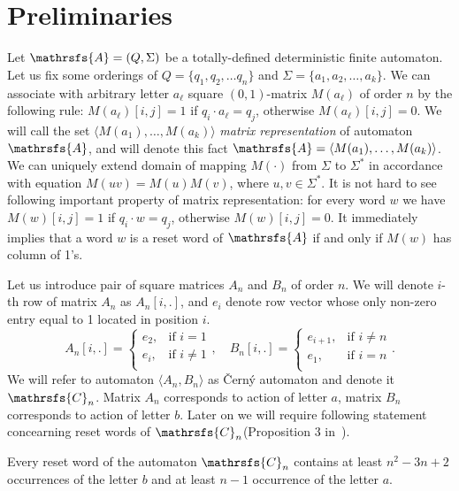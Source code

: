 \documentclass[11pt]{llncs}
\newcommand{\A}{\mathrsfs{A}}
\newcommand{\C}{\mathrsfs{C}}
\begin{document}
\section{Preliminaries}
Let $\A = (Q, \Sigma)$ be a totally-defined deterministic finite automaton. Let us fix some orderings 
of $Q = \{q_1, q_2, \ldots q_n\}$ and $\Sigma = \{a_1, a_2, \ldots, a_k\}$.
We can associate with arbitrary letter $a_\ell$
square $(0,1)$-matrix $M(a_\ell)$ of order $n$ by the following rule:
$M(a_\ell)[i,j] = 1$ if $q_i\cdot a_{\ell} = q_j$, otherwise $M(a_\ell)[i,j] = 0$.
We will call the set $\langle M(a_1), \ldots, M(a_{k})\rangle$  \emph{matrix representation} of automaton $\A$,
and will denote this fact $\A = \langle M(a_1), \ldots, M(a_{k})\rangle$. We can uniquely extend domain of mapping $M(\cdot )$ 
from $\Sigma$ to $\Sigma^{*}$ in accordance with equation $M(uv) = M(u)M(v)$, where $u,v \in \Sigma^*$.
It is not hard to see following important property of matrix representation: for every word $w$ we have
$M(w)[i,j] = 1$ if $q_i \cdot w = q_j$, otherwise $M(w)[i,j] = 0$. It immediately implies that
a word $w$ is a reset word of $\A$ if and only if $M(w)$ has column of 1's.

Let us introduce pair of square matrices $A_n$ and $B_n$ of order $n$. We will denote $i$-th row of matrix
$A_n$ as $A_n[i,.]$, and $e_i$ denote row vector whose only non-zero entry equal to 1 located in position $i$.
$$ A_n[i,.] = 
\begin{cases}
e_2, &\text{if } i = 1\\
e_i, &\text{if } i \neq 1\\
\end{cases},\quad
B_n[i,.] = 
\begin{cases}
e_{i+1}, &\text{if } i \neq n\\
e_1, &\text{if } i = n\\
\end{cases}.
$$
We will refer to automaton $\langle A_n, B_n \rangle$ as \v{C}ern\'{y} automaton and denote it $\C_n$.
Matrix $A_n$ corresponds to action of letter $a$, matrix $B_n$ corresponds to action of letter $b$.
Later on we will require following statement concearning reset words of $\C_n$(Proposition 3 in~\cite{Gu}).

\begin{proposition}
\label{th:cerny} Every reset word of the automaton $\mathrsfs{C}_n$ contains at
least $n^2 - 3n + 2$ occurrences of the letter $b$ and at least $n - 1$
occurrence of the letter $a$.
\end{proposition}
%
%
\end{document}
